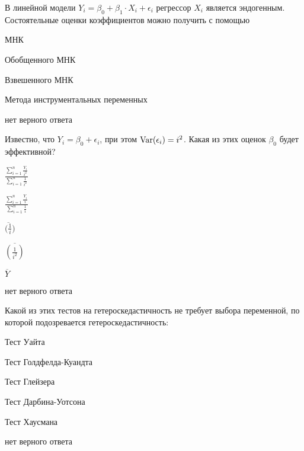 \begin{question}
В линейной модели \( Y_i = \beta_0 + \beta_1 \cdot X_i + \epsilon_i \) регрессор \( X_i \) 
является эндогенным. 
Состоятельные оценки коэффициентов можно получить с помощью
\begin{answerlist}
  \item МНК
  \item Обобщенного МНК
  \item Взвешенного МНК   
  \item Метода инструментальных переменных  
  \item нет верного ответа
\end{answerlist}
\end{question}





\begin{question}
Известно, что \( Y_i = \beta_0 + \epsilon_i \), при этом \( \operatorname{Var}(\epsilon_i)=i^2 \). 
Какая из этих оценок  \( \beta_0 \) будет эффективной?

\begin{answerlist}[2]
  \item \( \frac{\sum_{i=1}^{n} \frac{Y_i}{i^2}}{\sum_{i=1}^{n} \frac{1}{i^2}} \)
  \item \( \frac{\sum_{i=1}^{n} \frac{Y_i}{i}}{\sum_{i=1}^{n} \frac{1}{i}} \)
  \item \( \overline{(\frac{1}{i}}) \)
  \item \( \overline{(\frac{1}{i^2})} \)
  \item \( \overline Y \)
  \item нет верного ответа
\end{answerlist}
\end{question}

\begin{question}
Какой из этих тестов на гетероскедастичность не требует выбора переменной, 
  по которой подозревается гетероскедастичность:
\begin{answerlist}
  \item Тест Уайта
  \item Тест Голдфелда-Куандта
  \item Тест Глейзера
  \item Тест Дарбина-Уотсона
  \item Тест Хаусмана
  \item нет верного ответа
\end{answerlist}
\end{question}


